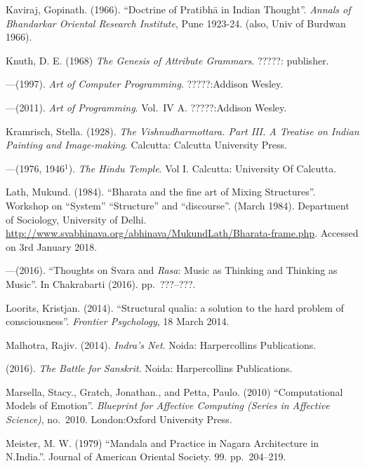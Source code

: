 \begin{thebibliography}{99}
Kaviraj, Gopinath. (1966). “Doctrine of Pratibhā in Indian Thought”. \textsl{Annals of Bhandarkar Oriental Research Institute}, Pune 1923-24. (also, Univ of Burdwan 1966).

Knuth, D. E. (1968) \textsl{The Genesis of Attribute Grammars}. ?????: publisher.

---\kern3pt(1997). \textsl{Art of Computer Programming}. ?????:Addison Wesley.

---\kern3pt(2011). \textsl{Art of Programming}. Vol.~IV A. ?????:Addison Wesley.

Kramrisch, Stella. (1928). \textsl{The Vishnudharmottara. Part III. A Treatise on Indian Painting and Image-making}. Calcutta: Calcutta University Press.

---\kern3pt(1976, 1946$^{1}$). \textsl{The Hindu Temple}. Vol I. Calcutta: University Of Calcutta.

Lath, Mukund. (1984). “Bharata and the fine art of Mixing Structures”. Workshop on “System” “Structure” and “discourse”. (March 1984). Department of Sociology, University of Delhi. \url{http://www.svabhinava.org/abhinava/MukundLath/Bharata-frame.php}. Accessed on 3rd January 2018.

---\kern3pt(2016). “Thoughts on Svara and \textsl{Rasa}: Music as Thinking and Thinking as Music”. In Chakrabarti (2016). pp.~???--???.

Loorits, Kristjan. (2014). “Structural qualia: a solution to the hard problem of consciousness”. \textsl{Frontier Psychology}, 18 March 2014.

Malhotra, Rajiv. (2014). \textsl{Indra’s Net}. Noida: Harpercollins Publications.

\kern3pt(2016). \textsl{The Battle for Sanskrit}. Noida: Harpercollins Publications.

Marsella, Stacy., Gratch, Jonathan., and Petta, Paulo. (2010) “Computational Models of Emotion”. \textsl{Blueprint for Affective Computing (Series in Affective Science)}, no.~2010. London:Oxford University Press.

Meister, M. W. (1979) “Mandala and Practice in Nagara Architecture in N.India.”. Journal of American Oriental Society. 99. pp.~204--219.


\end{thebibliography}
